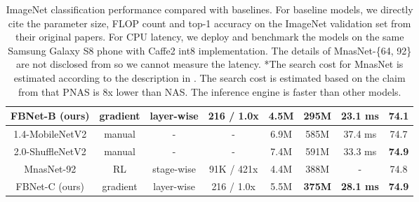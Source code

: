\documentclass[10pt,twocolumn,letterpaper]{article}
\begin{document}
\begin{table*}[h]
\begin{tabular}{c|ccc|cccc}
FBNet-B (ours)                              & gradient                                                 & layer-wise                                              & 216 / 1.0x                                                     & 4.5M         & \textbf{295M}    & \textbf{23.1 ms}                                                & 74.1                                                      \\ \hline
1.4-MobileNetV2 \cite{sandler2018mobilenetv2} & manual                                                   & -                                                       & -                                                              & 6.9M         & 585M    & 37.4 ms                                                   & 74.7                                                      \\
2.0-ShuffleNetV2 \cite{ma2018shufflenet}      & manual                                                   & -                                                       & -                                                              & 7.4M         & 591M    & 33.3 ms                                                   & \textbf{74.9}                                                      \\
MnasNet-92 \cite{tan2018mnasnet}              & RL                                                       & stage-wise                                              & 91K / 421x                                         & 4.4M         & 388M    & -                                                      & 74.8                                                     \\
FBNet-C (ours)                              & gradient                                                 & layer-wise                                              & 216 / 1.0x                                                       & 5.5M         & \textbf{375M}    & \textbf{28.1 ms}                                                   & \textbf{74.9}                                                     \\ \hline
\end{tabular}
\caption{ImageNet classification performance compared with baselines. For baseline models, we directly cite the parameter size, FLOP count and top-1 accuracy on the ImageNet validation set from their original papers. For CPU latency, we deploy and benchmark the models on the same Samsung Galaxy S8 phone with Caffe2 int8 implementation. The details of MnasNet-\{64, 92\} are not disclosed from \cite{tan2018mnasnet} so we cannot measure the latency. *The search cost for MnasNet is estimated according to the description in \cite{tan2018mnasnet}.  The search cost is estimated based on the claim from \cite{liu2017progressive} that PNAS \cite{liu2017progressive} is 8x lower than NAS\cite{zoph2017learning}.  The inference engine is faster than other models. } 
\label{tab:imagenet}
\end{table*}
\end{document}
